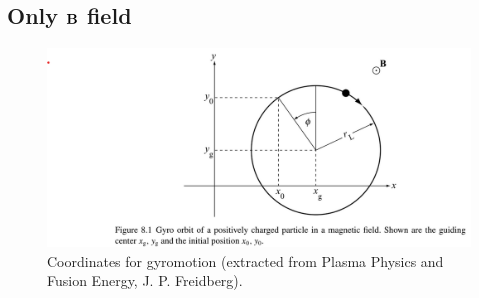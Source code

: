 \documentclass[a4paper,11pt]{report}
\begin{document}
\subsection{Only $\mathbf{B}$ field}
\begin{figure}[ht]
    \centering
    \includegraphics[width=\textwidth]{../../images/gyromotion_coordinates.png}
    \caption{Coordinates for gyromotion (extracted from Plasma Physics and Fusion Energy, J. P. Freidberg).}
    \label{fig:gyromotion_coordiantes}
\end{figure}
\end{document}
